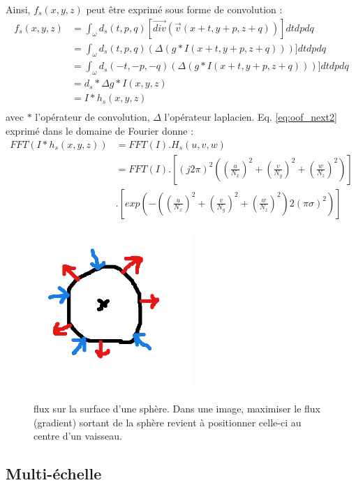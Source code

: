   Ainsi, $f_s(x,y,z)$ peut être exprimé sous forme de convolution :
  \begin{align}
    f_s(x,y,z) & = \int_{\omega} d_s(t,p,q) [\vec{div}( \vec{v}(x+t,y+p, z+q) )] dtdpdq \\
               & = \int_{\omega} d_s(t,p,q) (\Delta(g*I(x+t,y+p, z+q)))] dtdpdq \\
               & = \int_{\omega} d_s(-t,-p,-q) (\Delta(g*I(x+t,y+p, z+q)))] dtdpdq \\
               & = d_s * \Delta g * I(x,y,z) \\
               & = I * h_s(x,y,z) \\
    \label{eq:oof_next2}
  \end{align}
  avec $*$ l'opérateur de convolution, $\Delta$ l'opérateur laplacien.
  Eq. \ref{eq:oof_next2} exprimé dans le domaine de Fourier donne :
  \begin{align}
    FFT( I * h_s(x,y,z) ) &= FFT(I) . H_s(u,v,w) \\
                         &= FFT(I) . [ (j2 \pi)^2 ( (\frac{u}{N_x})^2 + (\frac{v}{N_y})^2 + (\frac{w}{N_z})^2 ) ] \\
                         & . [ exp( -( (\frac{u}{N_x})^2 + (\frac{v}{N_y})^2 + (\frac{w}{N_z})^2 ) 2(\pi\sigma)^2 ) ]
  \end{align}
  \begin{figure}[!ht]
    \centering
    \includegraphics[height=6cm]{Images/flux.png}
    \label{fig:flux_sphere}
    \caption{flux sur la surface d'une sphère. Dans une image, maximiser le flux (gradient) sortant de la sphère revient à positionner celle-ci au centre d'un vaisseau.}
  \end{figure}
  \subsection{Multi-échelle}
  \label{sec:EA:rehaussement:echelle:multiScale}

